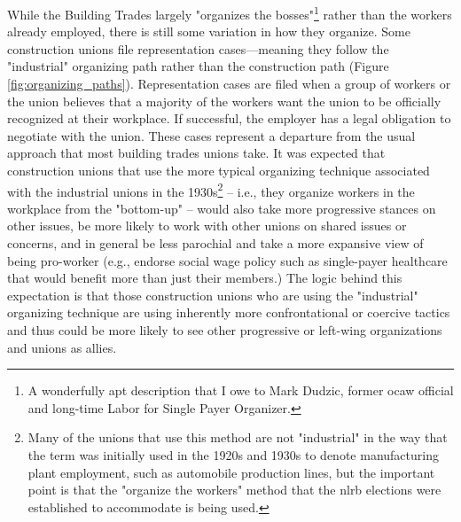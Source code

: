 \documentclass[12pt]{article}
\begin{document}
While the Building Trades largely "organizes the bosses"\footnote{A wonderfully apt description that I owe to Mark Dudzic, former \acrshort{ocaw} official and long-time Labor for Single Payer Organizer.} rather than the workers already employed, there is still some variation in how they organize. Some construction unions file representation cases---meaning they follow the "industrial" organizing path rather than the construction path (Figure \ref{fig:organizing_paths}). Representation cases are filed when a group of workers or the union believes that a majority of the workers want the union to be officially recognized at their workplace. If successful, the employer has a legal obligation to negotiate with the union. These cases represent a departure from the usual approach that most building trades unions take. It was expected that construction unions that use the more typical organizing technique associated with the industrial unions in the 1930s\footnote{Many of the unions that use this method are not "industrial" in the way that the term was initially used in the 1920s and 1930s to denote manufacturing plant employment, such as automobile production lines, but the important point is that the "organize the workers" method that the \acrshort{nlrb} elections were established to accommodate is being used.} -- i.e., they organize workers in the workplace from the "bottom-up" -- would also take more progressive stances on other issues, be more likely to work with other unions on shared issues or concerns, and in general be less parochial and take a more expansive view of being pro-worker (e.g., endorse social wage policy such as single-payer healthcare that would benefit more than just their members.) The logic behind this expectation is that those construction unions who are using the "industrial" organizing technique are using inherently more confrontational or coercive tactics and thus could be more likely to see other progressive or left-wing organizations and unions as allies.
\end{document}
